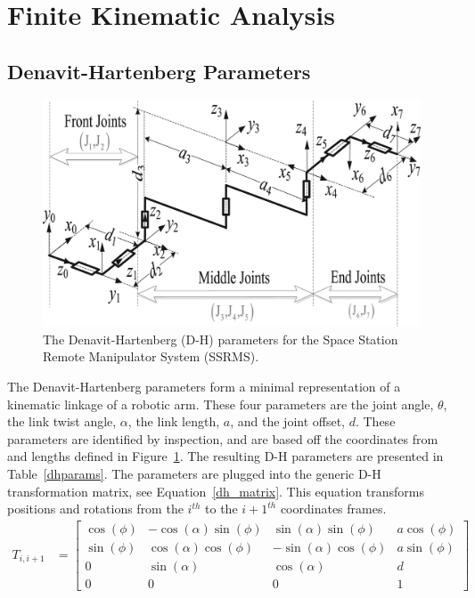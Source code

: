 \documentclass{article}
\begin{document}
\section{Finite Kinematic Analysis}
\subsection{Denavit-Hartenberg Parameters}
\begin{figure}[b!]
\includegraphics[width=\textwidth]{dh.jpg}
\caption{The Denavit-Hartenberg (D-H) parameters for the Space Station Remote Manipulator System (SSRMS).}
\label{dh_params}
\end{figure}

The Denavit-Hartenberg parameters form a minimal representation of a kinematic linkage of a robotic arm.
These four parameters are the joint angle, $\theta$, the link twist angle, $\alpha$, the link length, $a$, and the joint offset, $d$.
These parameters are identified by inspection, and are based off the coordinates from and lengths defined in Figure~\ref{dh_params}.
The resulting D-H parameters are presented in Table~\ref{dhparams}.
The parameters are plugged into the generic D-H transformation matrix, see Equation~\ref{dh_matrix}.
This equation transforms positions and rotations from the $i^{th}$ to the $i+1^{th}$ coordinates frames.
\begin{align}
T_{i, i+1} &=
\left[\begin{matrix}
\cos{\left (\phi \right )} & - \cos{\left (\alpha \right )} \sin{\left (\phi \right )} &   \sin{\left (\alpha \right )} \sin{\left (\phi \right )} & a \cos{\left (\phi \right )}\\
\sin{\left (\phi \right )} &   \cos{\left (\alpha \right )} \cos{\left (\phi \right )} & - \sin{\left (\alpha \right )} \cos{\left (\phi \right )} & a \sin{\left (\phi \right )}\\
                         0 &   \sin{\left (\alpha \right )}                            &   \cos{\left (\alpha \right )} & d\\
0 & 0 & 0 & 1
\end{matrix}\right]
\label{dh_matrix}
\end{align}
\end{document}
